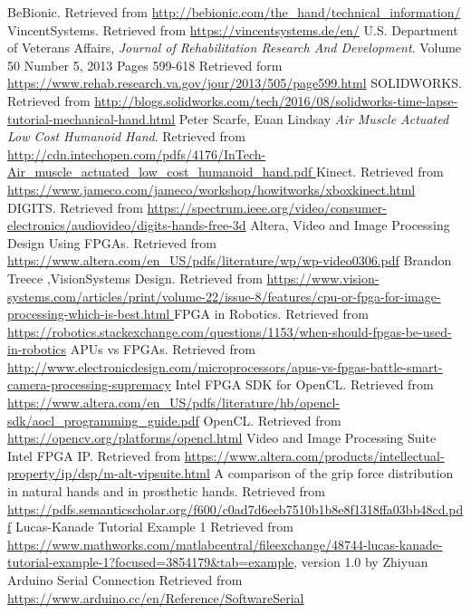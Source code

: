 \documentclass{article}
\begin{document}
\break
{}
\begin{thebibliography}{1}
	 BeBionic. Retrieved from {\url{http://bebionic.com/the_hand/technical_information/}} 
	 VincentSystems. Retrieved from {\url{  https://vincentsystems.de/en/}} 
	 U.S. Department of Veterans Affairs, {\em Journal of Rehabilitation Research And Development}. Volume 50 Number 5, 2013
   Pages 599-618 Retrieved form {\url{https://www.rehab.research.va.gov/jour/2013/505/page599.html}}
	 SOLIDWORKS. Retrieved from {\url{ http://blogs.solidworks.com/tech/2016/08/solidworks-time-lapse-tutorial-mechanical-hand.html}}
	 Peter Scarfe, Euan Lindsay {\em Air Muscle Actuated Low Cost Humanoid Hand}. Retrieved from {\url{ http://cdn.intechopen.com/pdfs/4176/InTech-Air_muscle_actuated_low_cost_humanoid_hand.pdf
}} 
	 Kinect. Retrieved from {\url{https://www.jameco.com/jameco/workshop/howitworks/xboxkinect.html}}
	 DIGITS. Retrieved from {\url{https://spectrum.ieee.org/video/consumer-electronics/audiovideo/digits-hands-free-3d}}	
	 Altera, Video and Image Processing Design Using FPGAs. Retrieved from {\url{https://www.altera.com/en_US/pdfs/literature/wp/wp-video0306.pdf}}
	 Brandon Treece ,VisionSystems Design. Retrieved from {\url{https://www.vision-systems.com/articles/print/volume-22/issue-8/features/cpu-or-fpga-for-image-processing-which-is-best.html	}}
	 FPGA in Robotics. Retrieved from {\url{https://robotics.stackexchange.com/questions/1153/when-should-fpgas-be-used-in-robotics}}
	 APUs vs FPGAs. Retrieved from {\url{http://www.electronicdesign.com/microprocessors/apus-vs-fpgas-battle-smart-camera-processing-supremacy}}
	 Intel FPGA SDK for OpenCL. Retrieved from {\url{https://www.altera.com/en_US/pdfs/literature/hb/opencl-sdk/aocl_programming_guide.pdf}}
	 OpenCL. Retrieved from {\url{https://opencv.org/platforms/opencl.html}}
	 Video and Image Processing Suite Intel FPGA IP. Retrieved from {\url{https://www.altera.com/products/intellectual-property/ip/dsp/m-alt-vipsuite.html}}
	 A comparison of the grip force distribution in natural hands and in prosthetic hands. Retrieved from {\url{https://pdfs.semanticscholar.org/f600/c0ad7d6ecb7510b1b8e8f1318ffa03bb48cd.pdf}}
	 Lucas-Kanade Tutorial Example 1 Retrieved from {\url{https://www.mathworks.com/matlabcentral/fileexchange/48744-lucas-kanade-tutorial-example-1?focused=3854179&tab=example}}, version 1.0 by Zhiyuan
	 Arduino Serial Connection Retrieved from {\url{https://www.arduino.cc/en/Reference/SoftwareSerial}}



\end{thebibliography}
  
\end{document}

